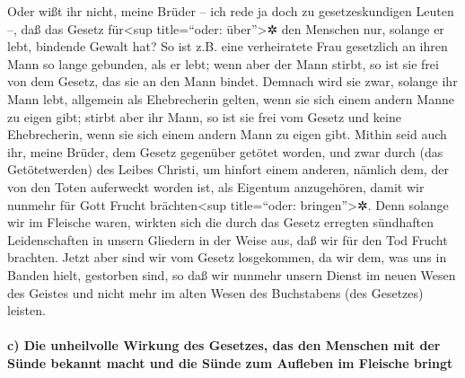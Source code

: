  Oder wißt ihr nicht, meine Brüder -- ich rede ja doch zu
gesetzeskundigen Leuten --, daß das Gesetz für\textless sup
title=``oder: über''\textgreater✲ den Menschen nur, solange er lebt,
bindende Gewalt hat?  So ist z.B. eine verheiratete Frau
gesetzlich an ihren Mann so lange gebunden, als er lebt; wenn aber der
Mann stirbt, so ist sie frei von dem Gesetz, das sie an den Mann bindet.
 Demnach wird sie zwar, solange ihr Mann lebt, allgemein
als Ehebrecherin gelten, wenn sie sich einem andern Manne zu eigen gibt;
stirbt aber ihr Mann, so ist sie frei vom Gesetz und keine Ehebrecherin,
wenn sie sich einem andern Mann zu eigen gibt.  Mithin
seid auch ihr, meine Brüder, dem Gesetz gegenüber getötet worden, und
zwar durch (das Getötetwerden) des Leibes Christi, um hinfort einem
anderen, nämlich dem, der von den Toten auferweckt worden ist, als
Eigentum anzugehören, damit wir nunmehr für Gott Frucht
brächten\textless sup title=``oder: bringen''\textgreater✲.
 Denn solange wir im Fleische waren, wirkten sich die
durch das Gesetz erregten sündhaften Leidenschaften in unsern Gliedern
in der Weise aus, daß wir für den Tod Frucht brachten. 
Jetzt aber sind wir vom Gesetz losgekommen, da wir dem, was uns in
Banden hielt, gestorben sind, so daß wir nunmehr unsern Dienst im neuen
Wesen des Geistes und nicht mehr im alten Wesen des Buchstabens (des
Gesetzes) leisten.

\hypertarget{c-die-unheilvolle-wirkung-des-gesetzes-das-den-menschen-mit-der-suxfcnde-bekannt-macht-und-die-suxfcnde-zum-aufleben-im-fleische-bringt}{%
\paragraph{c) Die unheilvolle Wirkung des Gesetzes, das den Menschen mit
der Sünde bekannt macht und die Sünde zum Aufleben im Fleische
bringt}\label{c-die-unheilvolle-wirkung-des-gesetzes-das-den-menschen-mit-der-suxfcnde-bekannt-macht-und-die-suxfcnde-zum-aufleben-im-fleische-bringt}}

